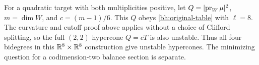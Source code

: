 \begin{remark}
For a quadratic target with both multiplicities positive, let
$Q=\lvert \operatorname{pr}_W\mu\rvert^2$, $m=\dim W$, and
$c=(m-1)/6$. This $Q$ obeys \eqref{bh:original-table} with $\ell=8$.
The curvature and cutoff proof above applies without a choice of
Clifford splitting, so the full $(2,2)$ hypercone $Q=cT$ is also
unstable. Thus all four bidegrees in this $\mathbb R^8\times\mathbb R^8$ construction
give unstable hypercones. The minimizing question for a codimension-two balance section is separate.
\end{remark}

